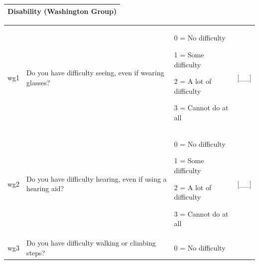 \documentclass[12pt,a4paper]{book}
\theoremstyle{definition}
\theoremstyle{definition}
\theoremstyle{definition}
\theoremstyle{remark}
\begin{document}
\begin{longtable}[]{@{}c@{}}
\toprule
\begin{minipage}[t]{0.97\columnwidth}\centering
\textbf{Disability (Washington Group)}\strut
\end{minipage}\tabularnewline
\bottomrule
\end{longtable}

\begin{longtable}[]{@{}llll@{}}
\toprule
\begin{minipage}[t]{0.24\columnwidth}\raggedright
wg1\strut
\end{minipage} & \begin{minipage}[t]{0.24\columnwidth}\raggedright
Do you have difficulty seeing, even if wearing glasses?\strut
\end{minipage} & \begin{minipage}[t]{0.24\columnwidth}\raggedright
0 = No difficulty

1 = Some difficulty

2 = A lot of difficulty

3 = Cannot do at all\strut
\end{minipage} & \begin{minipage}[t]{0.24\columnwidth}\raggedright
{[}\_\_{]}\strut
\end{minipage}\tabularnewline
\begin{minipage}[t]{0.24\columnwidth}\raggedright
wg2\strut
\end{minipage} & \begin{minipage}[t]{0.24\columnwidth}\raggedright
Do you have difficulty hearing, even if using a hearing aid?\strut
\end{minipage} & \begin{minipage}[t]{0.24\columnwidth}\raggedright
0 = No difficulty

1 = Some difficulty

2 = A lot of difficulty

3 = Cannot do at all\strut
\end{minipage} & \begin{minipage}[t]{0.24\columnwidth}\raggedright
{[}\_\_{]}\strut
\end{minipage}\tabularnewline
\begin{minipage}[t]{0.24\columnwidth}\raggedright
wg3\strut
\end{minipage} & \begin{minipage}[t]{0.24\columnwidth}\raggedright
Do you have difficulty walking or climbing steps?\strut
\end{minipage} & \begin{minipage}[t]{0.24\columnwidth}\raggedright
0 = No difficulty


\end{minipage}
\end{longtable}
\end{document}
